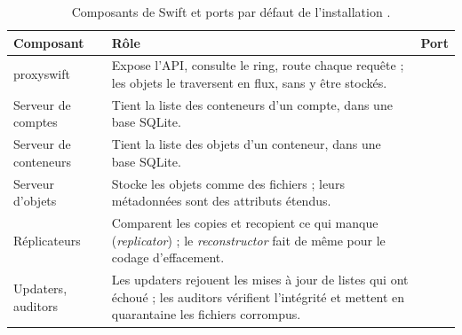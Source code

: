 \begin{table}[!ht]
\centering
\renewcommand{\arraystretch}{1.3}
\begin{tabular}{@{}>{\raggedright\arraybackslash}p{3.6cm}>{\raggedright\arraybackslash}p{10.0cm}>{\raggedright\arraybackslash}p{1.9cm}@{}}
\toprule
\textbf{Composant} & \textbf{Rôle} & \textbf{Port} \\
\midrule
\Gls{proxyswift} & Expose l'API, consulte le ring, route chaque requête ; les objets le traversent en flux, sans y être stockés. & 8080 \\
Serveur de comptes & Tient la liste des conteneurs d'un compte, dans une base SQLite. & 6202 \\
Serveur de conteneurs & Tient la liste des objets d'un conteneur, dans une base SQLite. & 6201 \\
Serveur d'objets & Stocke les objets comme des fichiers ; leurs métadonnées sont des attributs étendus. & 6200 \\
Réplicateurs & Comparent les copies et recopient ce qui manque (\emph{replicator}) ; le \emph{reconstructor} fait de même pour le codage d'effacement. & \\
Updaters, auditors & Les updaters rejouent les mises à jour de listes qui ont échoué ; les auditors vérifient l'intégrité et mettent en quarantaine les fichiers corrompus. & \\
\bottomrule
\end{tabular}
\caption{Composants de Swift et ports par défaut de l'installation \parencite{swift-architecture, swift-install-controller, swift-install-storage}.}
\label{tab:sw-composants}
\end{table}

